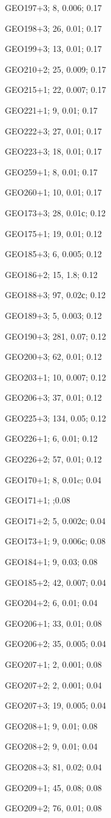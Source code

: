 GEO197+3; 8, 0.006; 0.17

GEO198+3; 26, 0.01; 0.17

GEO199+3; 13, 0.01; 0.17

GEO210+2; 25, 0.009; 0.17

GEO215+1; 22, 0.007; 0.17

GEO221+1; 9, 0.01; 0.17

GEO222+3; 27, 0.01; 0.17

GEO223+3; 18, 0.01; 0.17

GEO259+1; 8, 0.01; 0.17

GEO260+1; 10, 0.01; 0.17


GEO173+3; 28, 0.01с; 0.12

GEO175+1; 19, 0.01; 0.12

GEO185+3; 6, 0.005; 0.12

GEO186+2; 15, 1.8; 0.12

GEO188+3; 97, 0.02с; 0.12

GEO189+3; 5, 0.003; 0.12

GEO190+3; 281, 0.07; 0.12

GEO200+3; 62, 0.01; 0.12

GEO203+1; 10, 0.007; 0.12

GEO206+3; 37, 0.01; 0.12

GEO225+3; 134, 0.05; 0.12

GEO226+1; 6, 0.01; 0.12

GEO226+2; 57, 0.01; 0.12

GEO170+1; 8, 0.01c; 0.04

GEO171+1; ;0.08

GEO171+2; 5, 0.002с; 0.04

GEO173+1; 9, 0.006с; 0.08

GEO184+1; 9, 0.03; 0.08

GEO185+2; 42, 0.007; 0.04

GEO204+2; 6, 0.01; 0.04

GEO206+1; 33, 0.01; 0.08

GEO206+2; 35, 0.005; 0.04

GEO207+1; 2, 0.001; 0.08

GEO207+2; 2, 0.001; 0.04

GEO207+3; 19, 0.005; 0.04

GEO208+1; 9, 0.01; 0.08

GEO208+2; 9, 0.01; 0.04

GEO208+3; 81, 0.02; 0.04

GEO209+1; 45, 0.08; 0.08

GEO209+2; 76, 0.01; 0.08

